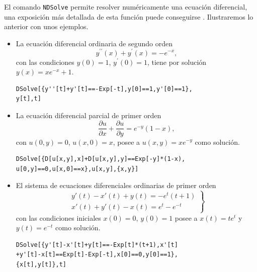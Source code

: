       El comando \verb"NDSolve" permite resolver numéricamente una ecuación diferencial,
      una exposición más detallada de esta función puede conseguirse \textcite{sofroniou_advanced_2008}. Ilustraremos lo anterior con unos ejemplos.
      \begin{itemize}
        \item La ecuación diferencial ordinaria de segundo orden
          $$ y^{\prime \prime }\left( x\right) + y^{\prime }\left(x\right) =-e^{-x},$$ con las condiciones
          $y\left( 0\right) =1$, $y^{\prime }\left( 0\right) =1$, tiene por solución $y\left( x\right) =xe^{-x}+1$.
          \begin{tcolorbox}
\begin{Verbatim}[formatcom=\letraverbatim]
DSolve[{y''[t]+y'[t]==-Exp[-t],y[0]==1,y'[0]==1},
y[t],t]
\end{Verbatim}
          \end{tcolorbox}

        \item La ecuación diferencial parcial de primer orden
          $$\frac{\partial u}{\partial x}+\frac{\partial u}{\partial y}=e^{-y}\left(1-x\right) ,$$ con $u\left( 0,y\right) =0$, $u\left( x,0\right) =x$, posee a $u\left( x,y\right) =xe^{-y}$ como solución.

          \begin{tcolorbox}
\begin{Verbatim}[formatcom=\letraverbatim]
DSolve[{D[u[x,y],x]+D[u[x,y],y]==Exp[-y]*(1-x),
u[0,y]==0,u[x,0]==x},u[x,y],{x,y}]
\end{Verbatim}
          \end{tcolorbox}

        \item El sistema de ecuaciones diferenciales ordinarias de primer orden
          $$\left.
          \begin{array}{l}
            y'(t)-x'(t)+y(t)=-e^t(t+1)\\
            x'(t)+y'(t)-x(t)=e^t-e^{-t}
        \end{array}\right \}$$
        con las condiciones iniciales $x(0)=0$, $y(0)=1$ posee a $x(t)= te^t$ y $y(t)=e^{-t}$ como solución.

        \begin{tcolorbox}[title=Instrucciones en Mathematica]
\begin{Verbatim}[formatcom=\letraverbatim]
DSolve[{y'[t]-x'[t]+y[t]==-Exp[t]*(t+1),x'[t]
+y'[t]-x[t]==Exp[t]-Exp[-t],x[0]==0,y[0]==1},
{x[t],y[t]},t]
\end{Verbatim}
        \end{tcolorbox}

    \end{itemize}

